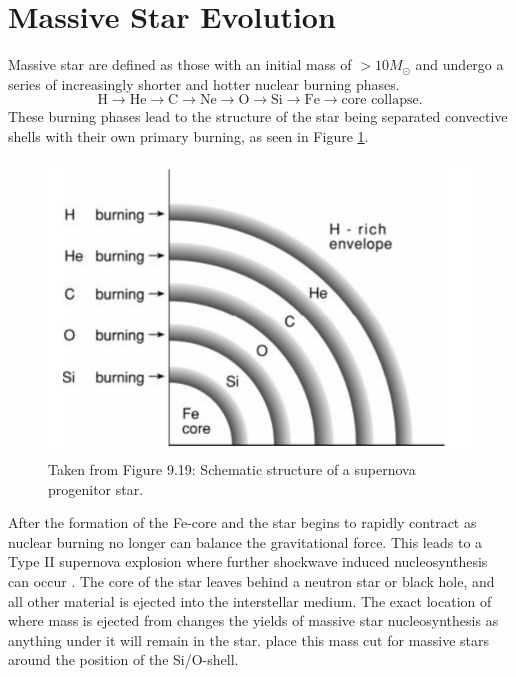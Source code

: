 \section{Massive Star Evolution}

Massive star are defined as those with an initial mass of $>10M_\odot$ and undergo a series of increasingly shorter and hotter nuclear burning phases.
\[
\mathrm{H} \rightarrow \mathrm{He} \rightarrow \mathrm{C} \rightarrow \mathrm{Ne} \rightarrow \mathrm{O} \rightarrow \mathrm{Si} \rightarrow \mathrm{Fe} \rightarrow \text{core collapse}.
\]
These burning phases lead to the structure of the star being separated convective shells with their own primary burning, as seen in Figure \ref{fig:Prialnik_Fig9.19}.
\begin{figure}[!htbp]
\includegraphics[width=\textwidth]{chapters/1/figures/Prialnik_Fig9.19.png}
\caption{Taken from \cite{prialnikIntroductionTheoryStellar2009} Figure 9.19: Schematic structure of a supernova progenitor star.
\label{fig:Prialnik_Fig9.19}}
\end{figure}

After the formation of the Fe-core and the star begins to rapidly contract as nuclear burning no longer can balance the gravitational force.
This leads to a Type II supernova explosion where further shockwave induced nucleosynthesis can occur \cite{prialnikIntroductionTheoryStellar2009}.
The core of the star leaves behind a neutron star or black hole, and all other material is ejected into the interstellar medium.
The exact location of where mass is ejected from changes the yields of massive star nucleosynthesis as anything under it will remain in the star.
\cite{ritterNuGridStellarData2018} place this mass cut for massive stars around the position of the Si/O-shell.

